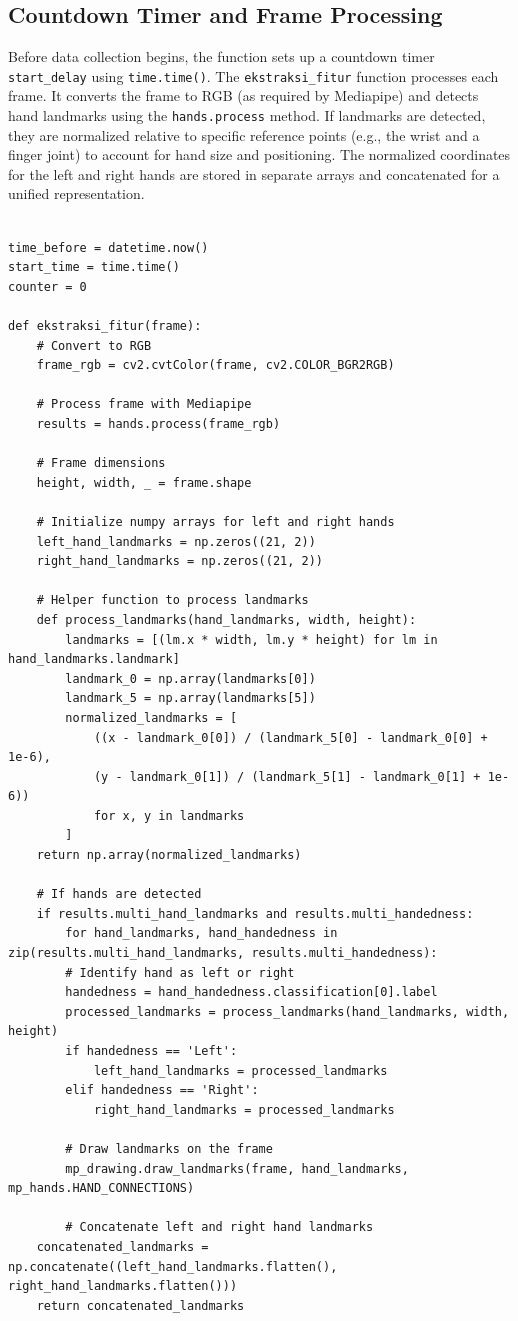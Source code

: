 \subsection{Countdown Timer and Frame Processing}
Before data collection begins, the function sets up a countdown timer \verb|start_delay| using \verb|time.time()|. The \verb|ekstraksi_fitur| function processes each frame. It converts the frame to RGB (as required by Mediapipe) and detects hand landmarks using the \verb|hands.process| method. If landmarks are detected, they are normalized relative to specific reference points (e.g., the wrist and a finger joint) to account for hand size and positioning. The normalized coordinates for the left and right hands are stored in separate arrays and concatenated for a unified representation.\\

\begin{lstlisting}
	
time_before = datetime.now()
start_time = time.time()
counter = 0
	
def ekstraksi_fitur(frame):
	# Convert to RGB
	frame_rgb = cv2.cvtColor(frame, cv2.COLOR_BGR2RGB)
	
	# Process frame with Mediapipe
	results = hands.process(frame_rgb)
	
	# Frame dimensions
	height, width, _ = frame.shape
	
	# Initialize numpy arrays for left and right hands
	left_hand_landmarks = np.zeros((21, 2))
	right_hand_landmarks = np.zeros((21, 2))
	
	# Helper function to process landmarks
	def process_landmarks(hand_landmarks, width, height):
		landmarks = [(lm.x * width, lm.y * height) for lm in hand_landmarks.landmark]
		landmark_0 = np.array(landmarks[0])
		landmark_5 = np.array(landmarks[5])
		normalized_landmarks = [
			((x - landmark_0[0]) / (landmark_5[0] - landmark_0[0] + 1e-6),
			(y - landmark_0[1]) / (landmark_5[1] - landmark_0[1] + 1e-6))
			for x, y in landmarks
		]
	return np.array(normalized_landmarks)
	
	# If hands are detected
	if results.multi_hand_landmarks and results.multi_handedness:
		for hand_landmarks, hand_handedness in zip(results.multi_hand_landmarks, results.multi_handedness):
		# Identify hand as left or right
		handedness = hand_handedness.classification[0].label
		processed_landmarks = process_landmarks(hand_landmarks, width, height)
		if handedness == 'Left':
			left_hand_landmarks = processed_landmarks
		elif handedness == 'Right':
			right_hand_landmarks = processed_landmarks
		
		# Draw landmarks on the frame
		mp_drawing.draw_landmarks(frame, hand_landmarks, mp_hands.HAND_CONNECTIONS)
		
		# Concatenate left and right hand landmarks
	concatenated_landmarks = np.concatenate((left_hand_landmarks.flatten(), right_hand_landmarks.flatten()))
	return concatenated_landmarks
\end{lstlisting}

